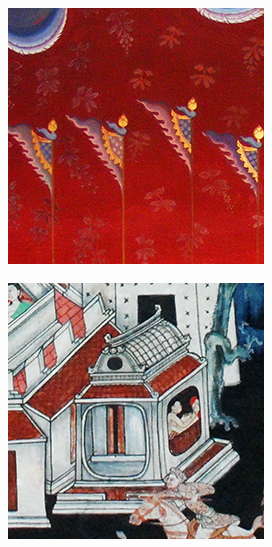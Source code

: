 \documentclass[xcolor=dvipsnames, xetex,serif]{beamer}
\numberwithin{equation}{section}
\begin{document}
\begin{frame}
\begin{figure}[H]
\begin{subfigure}{0.15\linewidth}
            \end{subfigure}
            \begin{subfigure}{0.15\linewidth}
                \centering
                \includegraphics[width=0.9\linewidth]{images/thaiart/case03-original.png}
            \end{subfigure}		
            \begin{subfigure}{0.15\linewidth}
                \centering
                \includegraphics[width=0.9\linewidth]{images/thaiart/case04-original.png}

\end{subfigure}
\end{figure}
\end{frame}
\end{document}
